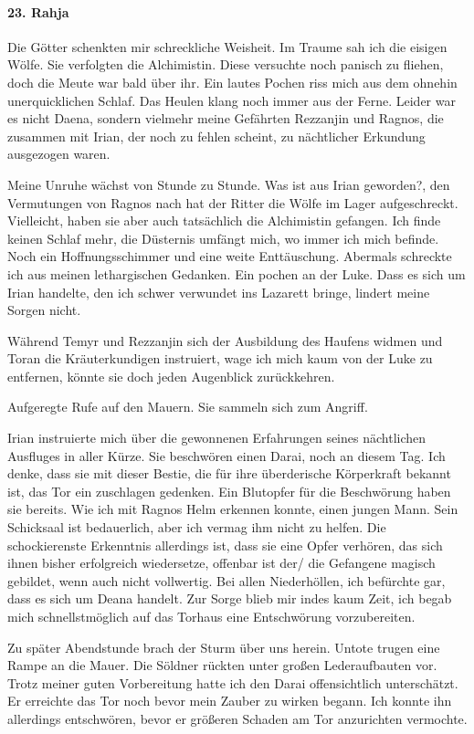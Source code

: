 \paragraph{23. Rahja}
Die Götter schenkten mir schreckliche Weisheit. Im Traume sah ich die eisigen Wölfe. Sie verfolgten die Alchimistin. Diese versuchte noch panisch zu fliehen, doch die Meute war bald über ihr. Ein lautes Pochen riss mich aus dem ohnehin unerquicklichen Schlaf. Das Heulen klang noch immer aus der Ferne. Leider war es nicht Daena, sondern vielmehr meine Gefährten Rezzanjin und Ragnos, die zusammen mit Irian, der noch zu fehlen scheint, zu nächtlicher Erkundung ausgezogen waren.

Meine Unruhe wächst von Stunde zu Stunde. Was ist aus Irian geworden?, den Vermutungen von Ragnos nach hat der Ritter die Wölfe im Lager aufgeschreckt. Vielleicht, haben sie aber auch tatsächlich die Alchimistin gefangen. Ich finde keinen Schlaf mehr, die Düsternis umfängt mich, wo immer ich mich befinde. Noch ein Hoffnungsschimmer und eine weite Enttäuschung. Abermals schreckte ich aus meinen lethargischen Gedanken. Ein pochen an der Luke. Dass es sich um Irian handelte, den ich schwer verwundet ins Lazarett bringe, lindert meine Sorgen nicht.

Während Temyr und Rezzanjin sich der Ausbildung des Haufens widmen und Toran die Kräuterkundigen instruiert, wage ich mich kaum von der Luke zu entfernen, könnte sie doch jeden Augenblick zurückkehren.

Aufgeregte Rufe auf den Mauern. Sie sammeln sich zum Angriff.

Irian instruierte mich über die gewonnenen Erfahrungen seines nächtlichen Ausfluges in aller Kürze. Sie beschwören einen Darai, noch an diesem Tag. Ich denke, dass sie mit dieser Bestie, die für ihre überderische Körperkraft bekannt ist, das Tor ein zuschlagen gedenken. Ein Blutopfer für die Beschwörung haben sie bereits. Wie ich mit Ragnos Helm erkennen konnte, einen jungen Mann. Sein Schicksaal ist bedauerlich, aber ich vermag ihm nicht zu helfen. Die schockierenste Erkenntnis allerdings ist, dass sie eine Opfer verhören, das sich ihnen bisher erfolgreich wiedersetze, offenbar ist der/ die Gefangene magisch gebildet, wenn auch nicht vollwertig. Bei allen Niederhöllen, ich befürchte gar, dass es sich um Deana handelt. Zur Sorge blieb mir indes kaum Zeit, ich begab mich schnellstmöglich auf das Torhaus eine Entschwörung vorzubereiten.

Zu später Abendstunde brach der Sturm über uns herein. Untote trugen eine Rampe an die Mauer. Die Söldner rückten unter großen Lederaufbauten vor. Trotz meiner guten Vorbereitung hatte ich den Darai offensichtlich unterschätzt. Er erreichte das Tor noch bevor mein Zauber zu wirken begann. Ich konnte ihn allerdings entschwören, bevor er größeren Schaden am Tor anzurichten vermochte.

